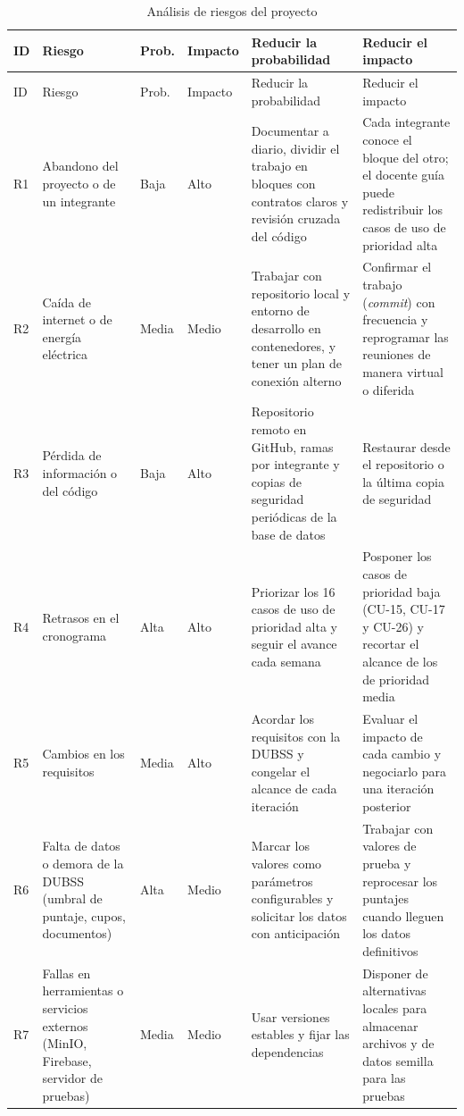 \begin{longtable}{>{\raggedright\arraybackslash}p{0.8cm} >{\raggedright\arraybackslash}p{3.0cm} >{\raggedright\arraybackslash}p{1.2cm} >{\raggedright\arraybackslash}p{1.2cm} >{\raggedright\arraybackslash}p{3.5cm} >{\raggedright\arraybackslash}p{3.5cm}}
\caption{Análisis de riesgos del proyecto}\label{tab:riesgos}\\
\toprule
ID & Riesgo & Prob. & Impacto & Reducir la probabilidad & Reducir el impacto \\
\midrule
\endfirsthead
\toprule
ID & Riesgo & Prob. & Impacto & Reducir la probabilidad & Reducir el impacto \\
\midrule
\endhead
\bottomrule
\endfoot
R1 & Abandono del proyecto o de un integrante & Baja & Alto & Documentar a diario, dividir el trabajo en bloques con contratos claros y revisión cruzada del código & Cada integrante conoce el bloque del otro; el docente guía puede redistribuir los casos de uso de prioridad alta \\
R2 & Caída de internet o de energía eléctrica & Media & Medio & Trabajar con repositorio local y entorno de desarrollo en contenedores, y tener un plan de conexión alterno & Confirmar el trabajo (\textit{commit}) con frecuencia y reprogramar las reuniones de manera virtual o diferida \\
R3 & Pérdida de información o del código & Baja & Alto & Repositorio remoto en GitHub, ramas por integrante y copias de seguridad periódicas de la base de datos & Restaurar desde el repositorio o la última copia de seguridad \\
R4 & Retrasos en el cronograma & Alta & Alto & Priorizar los 16 casos de uso de prioridad alta y seguir el avance cada semana & Posponer los casos de prioridad baja (CU-15, CU-17 y CU-26) y recortar el alcance de los de prioridad media \\
R5 & Cambios en los requisitos & Media & Alto & Acordar los requisitos con la DUBSS y congelar el alcance de cada iteración & Evaluar el impacto de cada cambio y negociarlo para una iteración posterior \\
R6 & Falta de datos o demora de la DUBSS (umbral de puntaje, cupos, documentos) & Alta & Medio & Marcar los valores como parámetros configurables y solicitar los datos con anticipación & Trabajar con valores de prueba y reprocesar los puntajes cuando lleguen los datos definitivos \\
R7 & Fallas en herramientas o servicios externos (MinIO, Firebase, servidor de pruebas) & Media & Medio & Usar versiones estables y fijar las dependencias & Disponer de alternativas locales para almacenar archivos y de datos semilla para las pruebas \\

\end{longtable}
